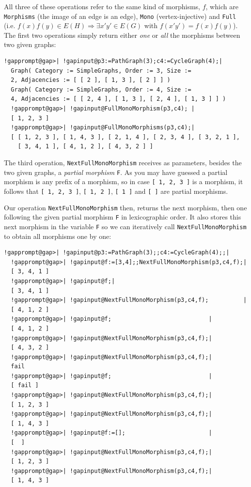 \documentclass[a4paper,11pt]{report}
\begin{document}
{{ 

All three of these operations refer to the same kind of morphisms, $f$, which are \texttt{Morphisms} (the image of an edge is an edge), \texttt{Mono} (vertex-injective) and \texttt{Full} (i.e. $f(x)f(y) \in E(H) \Rightarrow \exists x'y'\in E(G)$ with $ f(x'y')=f(x)f(y)$). The first two operations simply return either \emph{one} or \emph{all} the morphisms between two given graphs: 

 
\begin{Verbatim}[commandchars=!@|,fontsize=\small,frame=single,label=Example]
  !gapprompt@gap>| !gapinput@p3:=PathGraph(3);c4:=CycleGraph(4);|
  Graph( Category := SimpleGraphs, Order := 3, Size := 
  2, Adjacencies := [ [ 2 ], [ 1, 3 ], [ 2 ] ] )
  Graph( Category := SimpleGraphs, Order := 4, Size := 
  4, Adjacencies := [ [ 2, 4 ], [ 1, 3 ], [ 2, 4 ], [ 1, 3 ] ] )
  !gapprompt@gap>| !gapinput@FullMonoMorphism(p3,c4); |
  [ 1, 2, 3 ]
  !gapprompt@gap>| !gapinput@FullMonoMorphisms(p3,c4);|
  [ [ 1, 2, 3 ], [ 1, 4, 3 ], [ 2, 1, 4 ], [ 2, 3, 4 ], [ 3, 2, 1 ], 
    [ 3, 4, 1 ], [ 4, 1, 2 ], [ 4, 3, 2 ] ]
\end{Verbatim}
 

The third operation, \texttt{NextFullMonoMorphism} receives as parameters, besides the two given graphs, a \emph{partial morphism} \texttt{F}. As you may have guessed a partial morphism is any prefix of a morphism, so
in case \texttt{[ 1, 2, 3 ]} is a morphism, it follows that \texttt{[ 1, 2, 3 ]}, \texttt{[ 1, 2 ]}, \texttt{[ 1 ]} and \texttt{[ ]} are partial morphisms. 

Our operation \texttt{NextFullMonoMorphism} then, returns the next morphism, then one following the given partial morphism \texttt{F} in lexicographic order. It also stores this next morphism in the variable \texttt{F} so we can iteratively call \texttt{NextFullMonoMorphism} to obtain all morphisms one by one: 

 
\begin{Verbatim}[commandchars=!@|,fontsize=\small,frame=single,label=Example]
  !gapprompt@gap>| !gapinput@p3:=PathGraph(3);;c4:=CycleGraph(4);;|
  !gapprompt@gap>| !gapinput@f:=[3,4];;NextFullMonoMorphism(p3,c4,f);|
  [ 3, 4, 1 ]
  !gapprompt@gap>| !gapinput@f;|
  [ 3, 4, 1 ]
  !gapprompt@gap>| !gapinput@NextFullMonoMorphism(p3,c4,f);          |
  [ 4, 1, 2 ]
  !gapprompt@gap>| !gapinput@f;                            |
  [ 4, 1, 2 ]
  !gapprompt@gap>| !gapinput@NextFullMonoMorphism(p3,c4,f);|
  [ 4, 3, 2 ]
  !gapprompt@gap>| !gapinput@NextFullMonoMorphism(p3,c4,f);|
  fail
  !gapprompt@gap>| !gapinput@f;                            |
  [ fail ]
  !gapprompt@gap>| !gapinput@NextFullMonoMorphism(p3,c4,f);|
  [ 1, 2, 3 ]
  !gapprompt@gap>| !gapinput@NextFullMonoMorphism(p3,c4,f);|
  [ 1, 4, 3 ]
  !gapprompt@gap>| !gapinput@f:=[];                        |
  [  ]
  !gapprompt@gap>| !gapinput@NextFullMonoMorphism(p3,c4,f);|
  [ 1, 2, 3 ]
  !gapprompt@gap>| !gapinput@NextFullMonoMorphism(p3,c4,f);|
  [ 1, 4, 3 ]
\end{Verbatim}
 

}}
\end{document}
